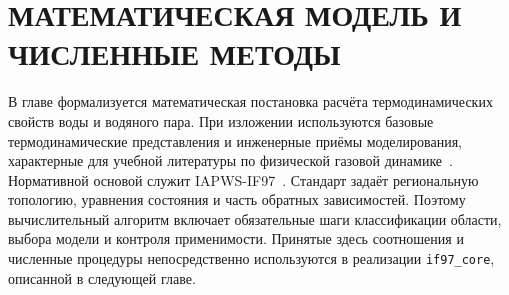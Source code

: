 \chapter{МАТЕМАТИЧЕСКАЯ МОДЕЛЬ И ЧИСЛЕННЫЕ МЕТОДЫ}

В главе формализуется математическая постановка расчёта
термодинамических свойств воды и водяного пара.
При изложении используются базовые термодинамические представления
и инженерные приёмы моделирования,
характерные для учебной литературы по физической газовой динамике~\cite{gidaspov_severina_2014}.
Нормативной основой служит IAPWS-IF97~\cite{iapws_if97_2012}.
Стандарт задаёт региональную топологию, уравнения состояния и часть обратных зависимостей.
Поэтому вычислительный алгоритм включает обязательные шаги
классификации области, выбора модели и контроля применимости.
Принятые здесь соотношения и численные процедуры
непосредственно используются в реализации \texttt{if97\_core},
описанной в следующей главе.










